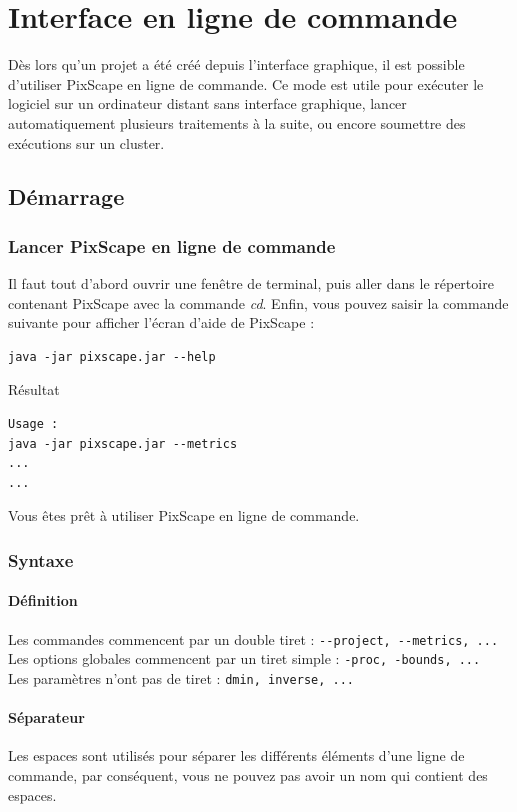 \documentclass{report}
\begin{document}
\chapter{Interface en ligne de commande}
\label{cli}

Dès lors qu'un projet a été créé depuis l'interface graphique, il est possible d'utiliser PixScape en ligne de commande. Ce mode est utile pour exécuter le logiciel sur un ordinateur distant sans interface graphique, lancer automatiquement plusieurs traitements à la suite, ou encore soumettre des exécutions sur un cluster.

\section{Démarrage}

\subsection{Lancer PixScape en ligne de commande}
Il faut tout d'abord ouvrir une fenêtre de terminal, puis aller dans le répertoire contenant PixScape avec la commande \textit{cd}.
Enfin, vous pouvez saisir la commande suivante pour afficher l'écran d'aide de PixScape :
\begin{Verbatim}
java -jar pixscape.jar --help
\end{Verbatim}
Résultat
\begin{Verbatim}
Usage :
java -jar pixscape.jar --metrics
...
...
\end{Verbatim}
Vous êtes prêt à utiliser PixScape en ligne de commande.

\subsection{Syntaxe}
\subsubsection{Définition}
Les commandes commencent par un double tiret : \verb|--project, --metrics, ...|\\
Les options globales commencent par un tiret simple : \verb|-proc, -bounds, ...|\\
Les paramètres n'ont pas de tiret : \verb|dmin, inverse, ...|

\subsubsection{Séparateur}
Les espaces sont utilisés pour séparer les différents éléments d'une ligne de commande, par conséquent, vous ne pouvez pas avoir un nom qui contient des espaces.\\
\end{document}
